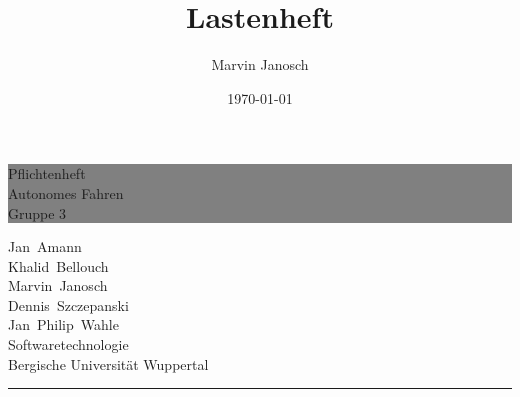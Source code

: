 \documentclass[11pt,a4paper]{article}
\date{\today}
\author{Marvin Janosch}
\title{Lastenheft}
\begin{document}
	\renewcommand{\thefootnote}{\roman{footnote}}
	\let\footnote=\endnote %


	
	
	\begin{titlepage} %
		
		
		\colorbox{grey}{
			\parbox[t]{0.93\textwidth}{ %
				\parbox[t]{0.91\textwidth}{ %
					\raggedleft %
					\fontsize{50pt}{50pt}\selectfont %
					\vspace{0.7cm} %
					
					Pflichtenheft\\
					\fontsize{30pt}{50pt}\selectfont
					Autonomes Fahren\\
					\fontsize{30pt}{80pt}\selectfont
					Gruppe 3\\
					
					\vspace{0.7cm} %
				}
			}
		}
		
		\vfill %
		
		
		\parbox[t]{0.93\textwidth}{ %
			\raggedleft %
			\large %
			{\Large Jan~Amann \\
			Khalid~Bellouch \\
			Marvin~Janosch \\
			Dennis~Szczepanski \\
			Jan~Philip~Wahle \\[8pt] %
			}
			Softwaretechnologie\\
			Bergische Universität Wuppertal \\[4pt] %
			
			\hfill\rule{0.2\linewidth}{1pt}%
		}
		
	\end{titlepage}
	
\end{document}
